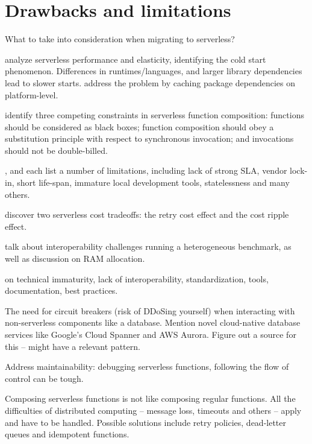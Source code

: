 \documentclass[utf8,english]{gradu3}
\begin{document}
\section{Drawbacks and limitations}

What to take into consideration when migrating to serverless?

\textcite{lloydserverless} analyze serverless performance and elasticity, identifying the cold start phenomenon. Differences in runtimes/languages, and larger library dependencies lead to slower starts. \textcite{oakes17pipsqueak} address the problem by caching package dependencies on platform-level.

\textcite{baldini17trilemma} identify three competing constraints in serverless function composition: functions should be considered as black boxes; function composition should obey a substitution principle with respect to synchronous invocation; and invocations should not be double-billed.

\textcite{robert2016serverlessarchitectures}, \textcite{adzic2017serverless} and \textcite{baldini17currentTrends} each list a number of limitations, including lack of strong SLA, vendor lock-in, short life-span, immature local development tools, statelessness and many others.

\textcite{kuhlenkamp17costradamus} discover two serverless cost tradeoffs: the retry cost effect and the cost ripple effect.

\textcite{malawski18benchmark} talk about interoperability challenges running a heterogeneous benchmark, as well as discussion on RAM allocation.

\textcite{cncf18serverlessWG} on technical immaturity, lack of interoperability, standardization, tools, documentation, best practices.

The need for circuit breakers (risk of DDoSing yourself) when interacting with non-serverless components like a database. Mention novel cloud-native database services like Google's Cloud Spanner and AWS Aurora. Figure out a source for this -- \textcite{hohpe2004enterprise} might have a relevant pattern.

Address maintainability: debugging serverless functions, following the flow of control can be tough.

Composing serverless functions is not like composing regular functions. All the difficulties of distributed computing -- message loss, timeouts and others -- apply and have to be handled. Possible solutions include retry policies, dead-letter queues and idempotent functions.
\end{document}
